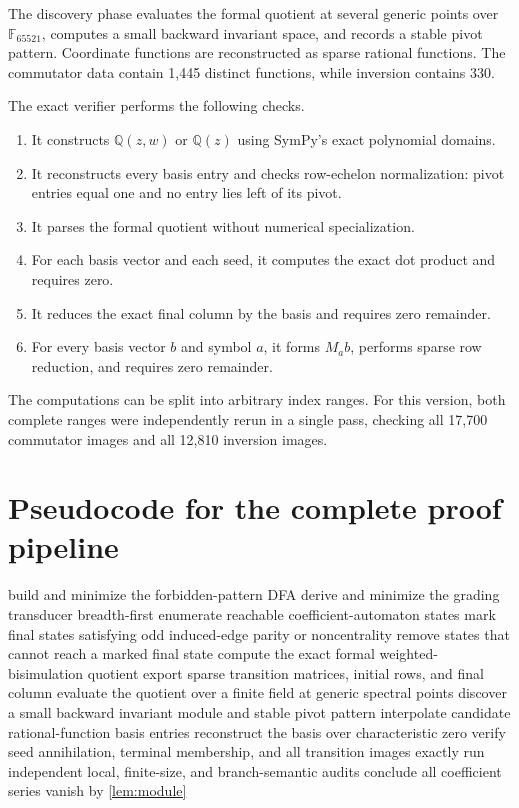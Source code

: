 \documentclass[10pt,letterpaper]{article}
\begin{document}
The discovery phase evaluates the formal quotient at several generic points over \(\mathbb F_{65521}\), computes a small backward invariant space, and records a stable pivot pattern.  Coordinate functions are reconstructed as sparse rational functions.  The commutator data contain 1,445 distinct functions, while inversion contains 330.

The exact verifier performs the following checks.
\begin{enumerate}
\item It constructs \(\mathbb Q(z,w)\) or \(\mathbb Q(z)\) using SymPy's exact polynomial domains.
\item It reconstructs every basis entry and checks row-echelon normalization: pivot entries equal one and no entry lies left of its pivot.
\item It parses the formal quotient without numerical specialization.
\item For each basis vector and each seed, it computes the exact dot product and requires zero.
\item It reduces the exact final column by the basis and requires zero remainder.
\item For every basis vector \(b\) and symbol \(a\), it forms \(M_ab\), performs sparse row reduction, and requires zero remainder.
\end{enumerate}
The computations can be split into arbitrary index ranges.  For this version, both complete ranges were independently rerun in a single pass, checking all 17,700 commutator images and all 12,810 inversion images.

\section{Pseudocode for the complete proof pipeline}\label{app:pipeline-code}

\begin{algorithm}[H]
\caption{End-to-end certificate generation and verification}\label{alg:full-pipeline}
\begin{algorithmic}[1]
\State build and minimize the forbidden-pattern DFA
\State derive and minimize the grading transducer
\State breadth-first enumerate reachable coefficient-automaton states
  \State mark final states satisfying odd induced-edge parity or noncentrality
  \State remove states that cannot reach a marked final state
  \State compute the exact formal weighted-bisimulation quotient
  \State export sparse transition matrices, initial rows, and final column
  \State evaluate the quotient over a finite field at generic spectral points
  \State discover a small backward invariant module and stable pivot pattern
  \State interpolate candidate rational-function basis entries
  \State reconstruct the basis over characteristic zero
  \State verify seed annihilation, terminal membership, and all transition images exactly
\EndFor
\State run independent local, finite-size, and branch-semantic audits
\State conclude all coefficient series vanish by \cref{lem:module}
\end{algorithmic}
\end{algorithm}
\end{document}
